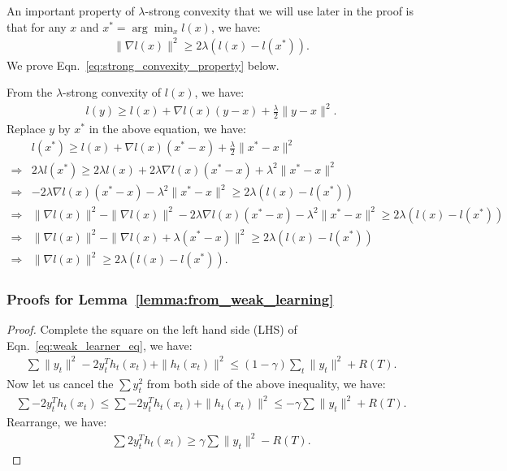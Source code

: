 An important property of $\lambda$-strong convexity that we will use later in the proof is that for any $x$ and $x^*=\arg\min_x l(x)$, we have:
\begin{align}
\label{eq:strong_convexity_property}
\|\nabla l(x)\|^2 \geq 2\lambda (l(x) - l(x^*)).
\end{align}We prove Eqn.~\ref{eq:strong_convexity_property} below.



From the $\lambda$-strong convexity of $l(x)$, we have:
\begin{align}
l(y) \geq l(x) + \nabla l(x)(y-x) + \frac{\lambda}{2}\|y - x\|^2.
\end{align} Replace $y$ by $x^*$ in the above equation, we have:
\begin{align}
&l(x^*) \geq l(x) + \nabla l(x)(x^* - x) + \frac{\lambda}{2}\|x^* - x\|^2 \nonumber \\
\Rightarrow & 2\lambda l(x^*) \geq 2\lambda l(x) + 2\lambda \nabla l(x)(x^* - x) + \lambda^2\|x^* - x\|^2 \nonumber \\
\Rightarrow & -2\lambda \nabla l(x)(x^* - x) - \lambda^2\|x^* - x\|^2 \geq 2\lambda (l(x) - l(x^*)) \nonumber \\
\Rightarrow &  \|\nabla l(x)\|^2 - \|\nabla l(x)\|^2-2\lambda \nabla l(x)(x^* - x) - \lambda^2\|x^* - x\|^2 \geq 2\lambda (l(x) - l(x^*)) \nonumber \\
\Rightarrow & \|\nabla l(x)\|^2 - \|\nabla l(x) + \lambda (x^* - x)\|^2 \geq 2\lambda(l(x) - l(x^*)) \nonumber \\
\Rightarrow & \|\nabla l(x)\|^2 \geq 2\lambda (l(x) - l(x^*)).
\end{align}

\subsubsection{Proofs for Lemma~\ref{lemma:from_weak_learning}}
\begin{proof}
Complete the square on the left hand side (LHS) of Eqn.~\ref{eq:weak_learner_eq}, we have:
\begin{align}
\sum \|y_t\|^2 - 2y_t^Th_t(x_t) + \|h_t(x_t)\|^2 \leq (1-\gamma)\sum_t \|y_t\|^2 + R(T).
\end{align} Now let us cancel the $\sum y_t^2$ from both side of the above inequality, we have:
\begin{align}
\sum -2y_t^T h_t(x_t) \leq \sum -2y_t^T h_t(x_t) + \|h_t(x_t)\|^2 \leq -\gamma\sum \|y_t\|^2 + R(T).
\end{align} Rearrange, we have:
\begin{align}
\sum 2y_t^T h_t(x_t) \geq \gamma\sum \|y_t\|^2 - R(T).
\end{align} 
\end{proof}

